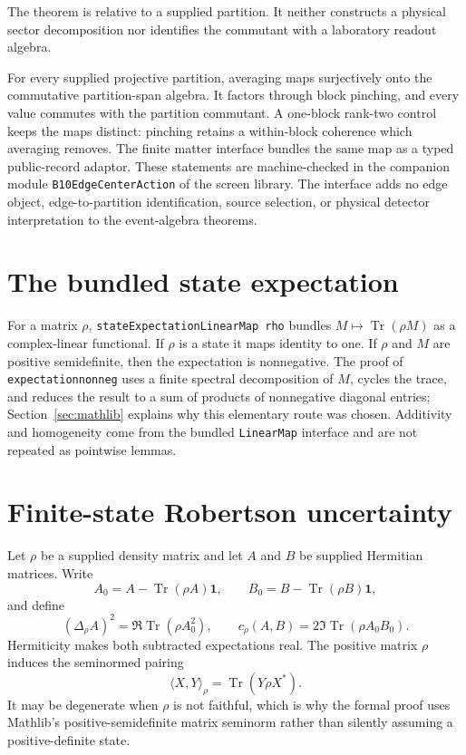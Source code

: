 \documentclass[11pt]{article}
\renewcommand{\_}{\textunderscore\allowbreak}
\theoremstyle{remark}
\newcommand{\Tr}{\operatorname{Tr}}
\newcommand{\one}{\mathbf 1}
\begin{document}
The theorem is relative to a supplied partition. It neither constructs a
physical sector decomposition nor identifies the commutant with a laboratory
readout algebra.

For every supplied projective partition, averaging maps surjectively onto the
commutative partition-span algebra. It factors through block pinching, and
every value commutes with the partition commutant. A one-block rank-two
control keeps the maps distinct: pinching retains a within-block coherence
which averaging removes. The finite matter interface bundles the same map as
a typed public-record adaptor. These statements are machine-checked in
the companion module \texttt{B10EdgeCenterAction} of the screen library. The interface adds no edge object,
edge-to-partition identification, source selection, or physical detector
interpretation to the event-algebra theorems.

\section{The bundled state expectation}
\label{sec:functional}

For a matrix $\rho$, \texttt{stateExpectationLinearMap rho} bundles
$M\mapsto\Tr(\rho M)$ as a complex-linear functional. If $\rho$ is a state it
maps identity to one. If $\rho$ and $M$ are positive semidefinite, then the
expectation is nonnegative. The proof of
\texttt{expectation\_nonneg} uses a finite spectral decomposition of $M$,
cycles the trace, and reduces the result to a sum of products of nonnegative
diagonal entries; Section~\ref{sec:mathlib} explains why this elementary
route was chosen. Additivity and homogeneity come from the bundled
\texttt{LinearMap} interface and are not repeated as pointwise lemmas.

\section{Finite-state Robertson uncertainty}
\label{sec:robertson}

Let $\rho$ be a supplied density matrix and let $A$ and $B$ be supplied
Hermitian matrices. Write
\[
 A_0=A-\Tr(\rho A)\one,
 \qquad
 B_0=B-\Tr(\rho B)\one,
\]
and define
\[
 (\Delta_\rho A)^2=\Re\Tr(\rho A_0^2),
 \qquad
 c_\rho(A,B)=2\Im\Tr(\rho A_0B_0).
\]
Hermiticity makes both subtracted expectations real. The positive matrix
$\rho$ induces the seminormed pairing
\[
 \langle X,Y\rangle_\rho=\Tr(Y\rho X^*).
\]
It may be degenerate when $\rho$ is not faithful, which is why the formal
proof uses Mathlib's positive-semidefinite matrix seminorm rather than
silently assuming a positive-definite state.
\end{document}
